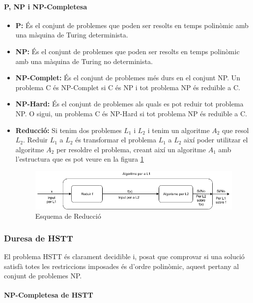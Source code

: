\documentclass[11pt,a4paper,twoside]{report}
\begin{document}
    \paragraph*{P, NP i NP-Completesa}
    \begin{itemize}
      \item \textbf{P: }És el conjunt de problemes que poden ser resolts en temps polinòmic amb una màquina de Turing determinista. 
      \item \textbf{NP: }És el conjunt de problemes que poden ser resolts en temps polinòmic amb una màquina de Turing no determinista. 
      \item \textbf{NP-Complet: }És el conjunt de problemes més durs en el conjunt NP. Un problema C és NP-Complet si C és NP i tot problema NP és reduïble a C.
      \item \textbf{NP-Hard: }És el conjunt de problemes als quals es pot reduir tot problema NP. O sigui, un problema C és NP-Hard si tot problema NP és reduïble a C. 
      \item \textbf{Reducció: }Si tenim dos problemes $L_1$ i $L_2$  i tenim un algoritme $A_2$ que resol $L_2$. Reduir $L_1$ a $L_2$ és transformar el problema $L_1$ a $L_2$ així poder utilitzar el algoritme $A_2$ per resoldre el problema, creant així un algoritme $A_1$ amb l'estructura que es pot veure en la figura \ref{fig:reduccio}
      \begin{figure}[ht!]
        \includegraphics[width=\textwidth]{Diagrames/Reduccio.png}
        \caption{Esquema de Reducció}
        \label{fig:reduccio}
      \end{figure}
      
    \end{itemize}

    \subsubsection{Duresa de HSTT}
    El problema HSTT és clarament decidible i, posat que comprovar si una solució satisfà totes les restriccions imposades és d'ordre polinòmic, aquest pertany al conjunt de problemes NP.
    
    \paragraph*{NP-Completesa de HSTT} ~\\
\end{document}
